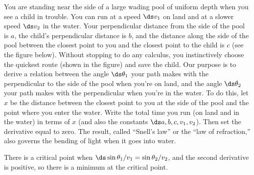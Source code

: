 \begin{exercises}
\begin{exercise}
You are standing near the side of a large wading pool of uniform depth when
you see a child in trouble.  You can run at a speed $\ds v_1$ on land and at a
slower speed $\ds v_2$ in the water.  Your perpendicular distance from the side
of the pool is $a$, the child's perpendicular distance is $b$, and the
distance along the side of the pool between the closest point to you and
the closest point to the child is $c$ (see the figure below). 
Without stopping to do any calculus, you instinctively choose the
quickest route (shown in the figure) and save the child.  Our
purpose is to derive a relation between the angle $\ds \theta_1$ your path
makes with the perpendicular to the side of the pool when you're on land,
and the angle $\ds \theta_2$ your path makes with the perpendicular when you're
in the water.  To do this, let $x$ be the distance between the closest
point to you at the side of the pool and the point where you enter the
water.  Write the total time you run (on land and in the water) in 
terms of $x$ (and also the constants $\ds a,b,c,v_1,v_2$).  Then set the
derivative equal to zero.  The result, called ``Snell's law'' or the ``law
of refraction,'' also governs the bending of light when it goes into water.
\begin{answer} There is a critical point when
$\ds \sin\theta_1/v_1=\sin\theta_2/v_2$, and the second derivative is
positive, so there is a minimum at the critical point.
\end{answer}\end{exercise}


\end{exercises}
